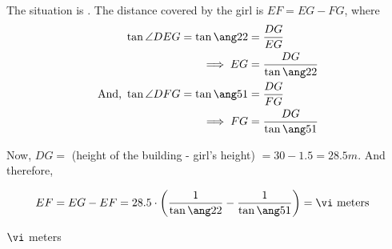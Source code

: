 \begin{solution}[\halfpage]
	The situation is \asif. The distance covered by the girl is $EF = EG - FG$, where
	\begin{align}
		\tan\angle{DEG} = \tan\ang\va &= \dfrac{DG}{EG} \\
		\implies EG &= \dfrac{DG}{\tan\ang\va} \\
		\text{And, }\tan\angle{DFG} = \tan\ang\vb &= \dfrac{DG}{FG} \\
		\implies FG &= \dfrac{DG}{\tan\ang\vb}
	\end{align}
	
	Now, $DG =$ (height of the building - girl's height) $= 30 - 1.5 = 28.5m$. And therefore, 
	
	\begin{align}
		EF = EG - EF &= 28.5\cdot\left(\dfrac{1}{\tan\ang\va} - \dfrac{1}{\tan\ang\vb}\right) = \vi\text{ meters}
	\end{align}
\end{solution}

\ifprintanswers\begin{codex}$\vi$ meters\end{codex}\fi
